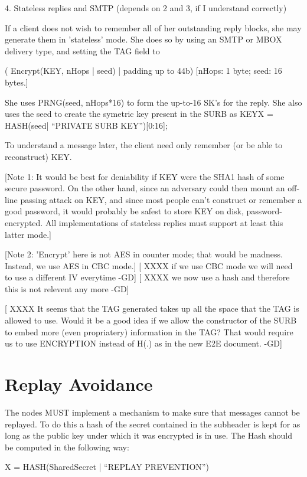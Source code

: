 4. Stateless replies and SMTP (depends on 2 and 3, if I understand correctly)

If a client does not wish to remember all of her outstanding
reply blocks, she may generate them in 'stateless' mode.  She  
does so by using an SMTP or MBOX delivery type, and setting
the TAG field to 

           ( Encrypt(KEY, nHops | seed) | padding up to 44b)
           [nHops: 1 byte; seed: 16 bytes.]

She uses PRNG(seed, nHops*16) to form the up-to-16 SK's for the reply.
She also uses the seed to create the symetric key present in the SURB
as KEYX = HASH(seed| ``PRIVATE SURB KEY'')[0:16];

To understand a message later, the client need only remember (or be
able to reconstruct) KEY.  

[Note 1: It would be best for deniability if KEY were the SHA1 hash of
some secure password.  On the other hand, since an adversary could
then mount an off-line passing attack on KEY, and since most people
can't construct or remember a good password, it would probably be
safest to store KEY on disk, password-encrypted.  All implementations
of stateless replies must support at least this latter mode.]

[Note 2: 'Encrypt' here is not AES in counter mode; that would be
madness.  Instead, we use AES in CBC mode.]
[ XXXX if we use CBC mode we will need to use a different IV everytime -GD]
[ XXXX we now use a hash and therefore this is not relevent any more -GD]

[ XXXX It seems that the TAG generated takes up all the space that the TAG 
	is allowed to use. Would it be a good idea if we allow the constructor
	of the SURB to embed more (even propriatery) information in the TAG?
	That would require us to use ENCRYPTION instead of H(.) as in the new
	E2E document. -GD]

\section{Replay Avoidance}

The nodes MUST implement a mechanism to make sure that messages cannot
be replayed. To do this a hash of the secret contained in the
subheader is kept for as long as the public key under which it was
encrypted is in use. The Hash should be computed in the following way:

X = HASH(SharedSecret | ``REPLAY PREVENTION'')

